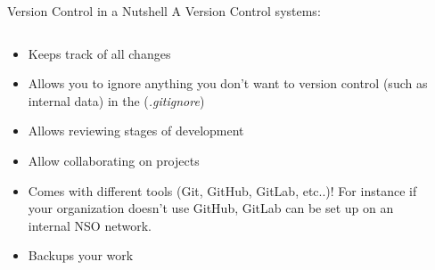 \documentclass[xcolor=x11names,compress]{beamer}
\renewcommand{\(}{\begin{columns}}
\renewcommand{\)}{\end{columns}}
\newcommand{\<}[1]{\begin{column}{#1}}
\renewcommand{\>}{\end{column}}
\begin{document}
\begin{frame}{Version Control in a Nutshell }
A Version Control systems:
\begin{columns}[t]
\begin{column}{0.6\textwidth}
\begin{itemize}[<+->]
    \item Keeps track of all changes
    \item Allows you to ignore anything you don't want to version control (such as internal data) in the (\emph{.gitignore})
    \item Allows reviewing stages of development
    \item Allow collaborating on projects
    \item Comes with different tools (Git, GitHub, GitLab, etc..)! For instance if your organization doesn't use GitHub, GitLab can be set up on an internal NSO network.
    \item Backups your work
  \end{itemize}
 \end{column}
  \begin{column}{0.4\textwidth}
    \begin{center}
    \begin{itemize}
    \end{itemize}
    \end{center}
  \end{column}
\end{columns}
\end{frame}
\end{document}
